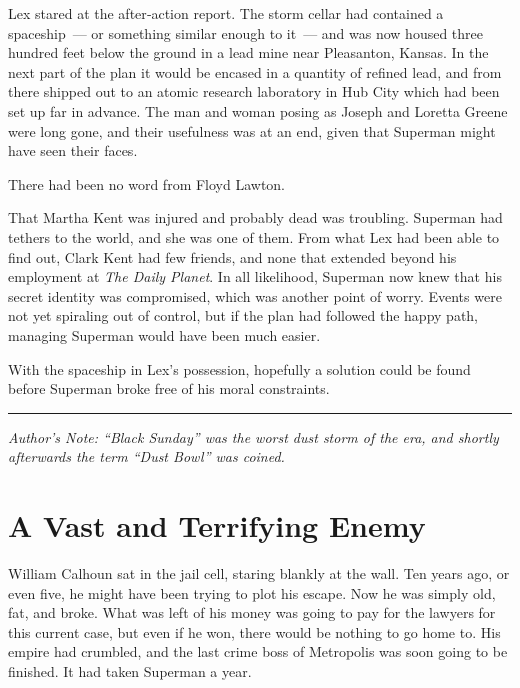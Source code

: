 \documentclass[ebook,12pt]{memoir}
\begin{document}
Lex stared at the after‐action report. The storm cellar had contained a
spaceship~--- or something similar enough to it~--- and was now housed
three hundred feet below the ground in a lead mine near Pleasanton,
Kansas. In the next part of the plan it would be encased in a quantity
of refined lead, and from there shipped out to an atomic research
laboratory in Hub City which had been set up far in advance. The man and
woman posing as Joseph and Loretta Greene were long gone, and their
usefulness was at an end, given that Superman might have seen their
faces.

There had been no word from Floyd Lawton.

That Martha Kent was injured and probably dead was troubling. Superman
had tethers to the world, and she was one of them. From what Lex had
been able to find out, Clark Kent had few friends, and none that
extended beyond his employment at \emph{The Daily Planet}. In all
likelihood, Superman now knew that his secret identity was compromised,
which was another point of worry. Events were not yet spiraling out of
control, but if the plan had followed the happy path, managing Superman
would have been much easier.

With the spaceship in Lex's possession, hopefully a solution could be
found before Superman broke free of his moral constraints.

\begin{center}\rule{0.5\linewidth}{\linethickness}\end{center}

\emph{Author's Note: ``Black Sunday'' was the worst dust storm of the
era, and shortly afterwards the term ``Dust Bowl'' was coined.}
\chapter{A Vast and Terrifying Enemy}\label{a-vast-and-terrifying-enemy}

William Calhoun sat in the jail cell, staring blankly at the wall. Ten
years ago, or even five, he might have been trying to plot his escape.
Now he was simply old, fat, and broke. What was left of his money was
going to pay for the lawyers for this current case, but even if he won,
there would be nothing to go home to. His empire had crumbled, and the
last crime boss of Metropolis was soon going to be finished. It had
taken Superman a year.
\end{document}
